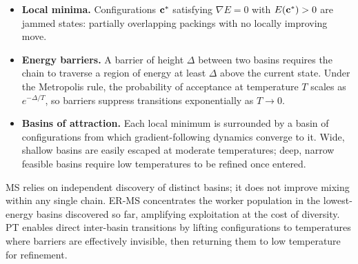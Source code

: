 \begin{itemize}
  \item \textbf{Local minima.} Configurations $\mathbf{c}^*$ satisfying
        $\nabla E = 0$ with $E(\mathbf{c}^*) > 0$ are jammed states: partially
        overlapping packings with no locally improving move.
  \item \textbf{Energy barriers.} A barrier of height $\Delta$ between
        two basins requires the chain to traverse a region of energy at
        least $\Delta$ above the current state. Under the Metropolis rule,
        the probability of acceptance at temperature $T$ scales as
        $e^{-\Delta/T}$, so barriers suppress transitions exponentially
        as $T \to 0$.
  \item \textbf{Basins of attraction.} Each local minimum is surrounded
        by a basin of configurations from which gradient-following
        dynamics converge to it. Wide, shallow basins are easily escaped
        at moderate temperatures; deep, narrow feasible basins require
        low temperatures to be refined once entered.
\end{itemize}

MS relies on independent discovery of distinct basins; it does not
improve mixing within any single chain.
ER-MS concentrates the worker population in the lowest-energy basins
discovered so far, amplifying exploitation at the cost of diversity.
PT enables direct inter-basin transitions by lifting configurations to
temperatures where barriers are effectively invisible, then returning
them to low temperature for refinement.

